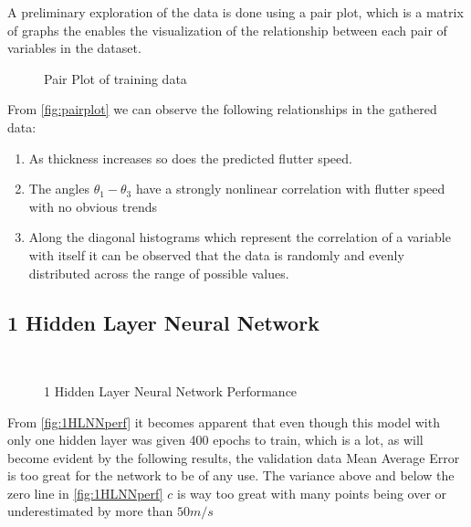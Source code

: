 A preliminary exploration of the data is done using a pair plot, which is a matrix of graphs the enables the visualization of the relationship between each pair of variables in the dataset.

\begin{figure}[H]
    \centering
    
    \caption{Pair Plot of training data}
    \label{fig:pairplot}
\end{figure}

From \autoref{fig:pairplot} we can observe the following relationships in the gathered data:

\begin{enumerate}
\def\labelenumi{\arabic{enumi}.}
\item
  As thickness increases so does the predicted flutter speed.
\item
  The angles \(\theta_{1} - \theta_{3}\) have a strongly nonlinear
  correlation with flutter speed with no obvious trends
\item
  Along the diagonal histograms which represent the correlation of a
  variable with itself it can be observed that the data is randomly and
  evenly distributed across the range of possible values.
\end{enumerate}

\subsection{1 Hidden Layer Neural Network}\label{hidden-layer-neural-network}

\begin{figure}[H]
  \centering
   \\
  \subfloat[Residulas]{}

  \caption{1 Hidden Layer Neural Network Performance}
  \label{fig:1HLNNperf}
\end{figure}

From \autoref{fig:1HLNNperf} it becomes apparent that even though this model with only one hidden layer was given 400 epochs to train, which is a lot, as will become evident by the following results, the validation data Mean Average Error is too great for the network to be of any use. The variance above and below the zero line in \autoref{fig:1HLNNperf} $c$ is way too great with many points being over or underestimated by more
than $50 m/s$

